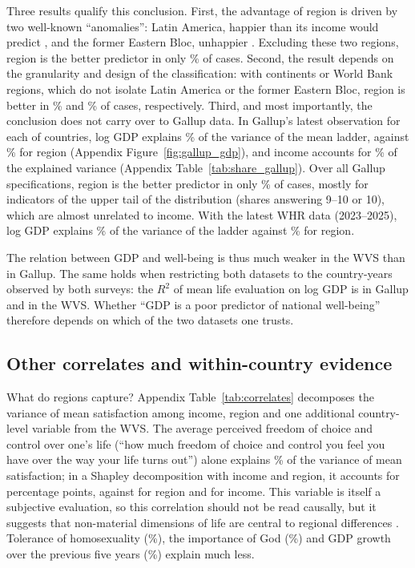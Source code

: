 \documentclass[12pt]{article}
\begin{document}
Three results qualify this conclusion. First, the advantage of region is driven by two well-known ``anomalies'': Latin America, happier than its income would predict \citep{graham_paradox_2009,rojas_handbook_2016}, and the former Eastern Bloc, unhappier \citep{guriev_unhappiness_2009}. Excluding these two regions, region is the better predictor in only \shareRegionBetterNoLatamEE\% of cases. Second, the result depends on the granularity and design of the classification: with continents or World Bank regions, which do not isolate Latin America or the former Eastern Bloc, region is better in \shareRegionBetterContinents\% and \shareRegionBetterWB\% of cases, respectively. Third, and most importantly, the conclusion does not carry over to Gallup data. In Gallup's latest observation for each of \nGallupCountries countries, log GDP explains \RtwoGallupMeanPPP\% of the variance of the mean ladder, against \RtwoGallupRegion\% for region (Appendix Figure~\ref{fig:gallup_gdp}), and income accounts for \shareIncomeGallupMean\% of the explained variance (Appendix Table~\ref{tab:share_gallup}). Over all Gallup specifications, region is the better predictor in only \shareRegionBetterGallup\% of cases, mostly for indicators of the upper tail of the distribution (shares answering 9--10 or 10), which are almost unrelated to income. With the latest WHR data (2023--2025), log GDP explains \RtwoWHRPPP\% of the variance of the ladder against \RtwoWHRRegion\% for region.

The relation between GDP and well-being is thus much weaker in the WVS than in Gallup. The same holds when restricting both datasets to the \nCommon country-years observed by both surveys: the $R^2$ of mean life evaluation on log GDP is \RtwoCommonGallup in Gallup and \RtwoCommonWVS in the WVS. Whether ``GDP is a poor predictor of national well-being'' therefore depends on which of the two datasets one trusts.

\subsection{Other correlates and within-country evidence}\label{subsec:correlates}

What do regions capture? Appendix Table~\ref{tab:correlates} decomposes the variance of mean satisfaction among income, region and one additional country-level variable from the WVS. The average perceived freedom of choice and control over one's life (``how much freedom of choice and control you feel you have over the way your life turns out'') alone explains \RtwoFreedomSatisfaction\% of the variance of mean satisfaction; in a Shapley decomposition with income and region, it accounts for \shapleyFreedom percentage points, against \shapleyFreedomRegion for region and \shapleyFreedomIncome for income. This variable is itself a subjective evaluation, so this correlation should not be read causally, but it suggests that non-material dimensions of life are central to regional differences \citep{inglehart_development_2008}. Tolerance of homosexuality (\RtwoTolerance\%), the importance of God (\RtwoGod\%) and GDP growth over the previous five years (\RtwoGrowth\%) explain much less.
\end{document}
